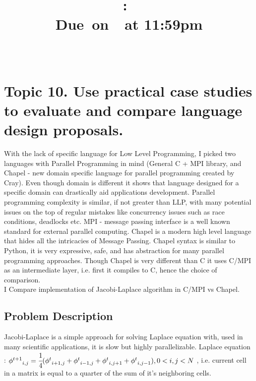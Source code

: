 \documentclass{article}
\title{
    \vspace{2in}
    \textmd{\textbf{\hmwkClass:\ \hmwkTitle}}\\
        \normalsize\vspace{0.1in}\small{Due\ on\ \hmwkDueDate\ at 11:59pm}\\
        \vspace{0.1in}\large{\textit{\hmwkClassInstructor\ \hmwkClassTime}}
    \vspace{3in}
}
\author{\textbf{\hmwkAuthorName}}
\date{}
\begin{document}
\maketitle

\pagebreak

        \section{Topic 10.  Use practical case studies to evaluate and compare language design proposals.}


        With the lack of specific language for Low Level Programming, I picked two languages with
        Parallel Programming in mind (General C + MPI library, and Chapel - new domain specific
        language for parallel programming created by Cray).  Even though domain is different it
        shows that language designed for a specific domain can drastically aid applications
        development.
        Parallel programming complexity is similar, if not greater than
        LLP, with many potential issues on the top of regular mistakes like concurrency issues
        such as race conditions, deadlocks etc.
        MPI - message passing interface is a well known standard for external parallel computing.
        Chapel  is a modern high level language that hides
        all the intricacies of Message Passing. Chapel syntax is similar to Python, it is
        very expressive, safe, and has abstraction for many parallel programming approaches.
        Though Chapel is very different than C it uses C/MPI as an intermediate layer, i.e.
        first it compiles to C, hence the choice of comparison.\\
    
        I Compare implementation of Jacobi-Laplace algorithm in C/MPI vs Chapel. 
        
        \subsection{Problem Description}
        Jacobi-Laplace is a
        simple approach for solving Laplace equation with, used in many
        scientific applications, it is slow but highly parallelizable. 
        Laplace equation : 
        ${\phi^{t+1}}_{i,j} = \cfrac{1}{4} ({\phi^{t}}_{i+1,j} + {\phi^{t}}_{i-1,j} +
        {\phi^{t}}_{i,j+1} + {\phi^{t}}_{i,j-1}), 0 < i, j< N$ , i.e. current cell in a matrix is
        equal to a quarter of the sum of it's neighboring cells.\\
    
\end{document}
